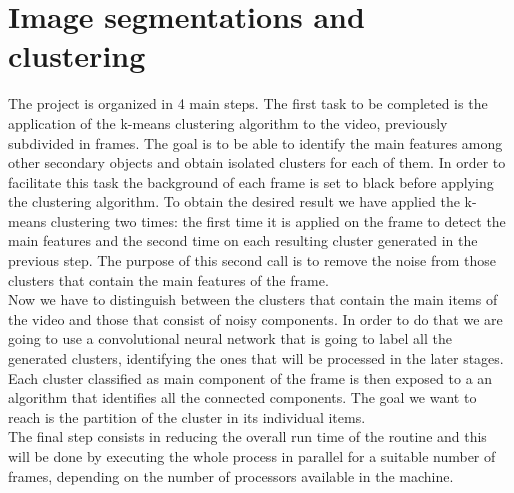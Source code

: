 \documentclass{article}
\begin{document}
{\section{Image segmentations and clustering}
The project is organized in 4 main steps. The first task to be completed is the application of the k-means clustering algorithm to the video, previously subdivided in frames. The goal is to be able to identify the main features among other secondary objects and obtain isolated clusters for each of them. In order to facilitate this task the background of each frame is set to black before applying the clustering algorithm. To obtain the desired result we have applied the k-means clustering two times: the first time it is applied on the frame to detect the main features and the second time on each resulting cluster generated in the previous step. The purpose of this second call is to remove the noise from those clusters that contain the main features of the frame. \\
Now we have to distinguish between the clusters that contain the main items of the video and those that consist of noisy components. In order to do that we are going to use a convolutional neural network that is going to label all the generated clusters, identifying the ones that will be processed in the later stages. \\
Each cluster classified as main component of the frame is then exposed to a an algorithm that identifies all the connected components. The goal we want to reach is the partition of the cluster in its individual items.  \\
The final step consists in reducing the overall run time of the routine and this will be done by executing the whole process in parallel for a suitable number of frames, depending on the number of processors available in the machine.
}
\end{document}
